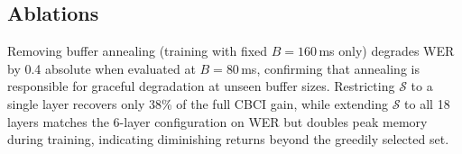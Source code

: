 \subsection{Ablations}
Removing buffer annealing (training with fixed $B{=}160$\,ms only) degrades WER by 0.4 absolute when
evaluated at $B{=}80$\,ms, confirming that annealing is responsible for graceful degradation at unseen
buffer sizes. Restricting $\mathcal{S}$ to a single layer recovers only 38\% of the full CBCI gain,
while extending $\mathcal{S}$ to all 18 layers matches the 6-layer configuration on WER but doubles peak
memory during training, indicating diminishing returns beyond the greedily selected set.
